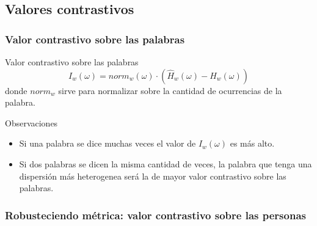 \subsection{Valores contrastivos}
\begin{frame}[t]\frametitle{Valor contrastivo sobre las palabras}
\label{valoresContrastivos}
    \begin{alertblock}{Valor contrastivo sobre las palabras}
        \begin{equation}
            I_w(\omega) = norm_{w}(\omega) \cdot (\widehat{H}_{w}(\omega) - H_{w}(\omega))
            \label{eq:iw}
        \end{equation}
        donde \hyperlink{fr:metrica}{$norm_w$} sirve para normalizar sobre la cantidad de ocurrencias de la palabra.
    \end{alertblock}

    \begin{block}{Observaciones}
        \begin{itemize}
            \item Si una palabra se dice muchas veces el valor de $I_w(\omega)$ es más alto.
            \item Si dos palabras se dicen la misma cantidad de veces, la palabra que tenga una dispersión más heterogenea será la de mayor valor contrastivo sobre las palabras.
        \end{itemize}
    \end{block}

\end{frame}

\begin{frame}[t]\frametitle{Robusteciendo métrica: valor contrastivo sobre las personas}



    
\end{frame}

